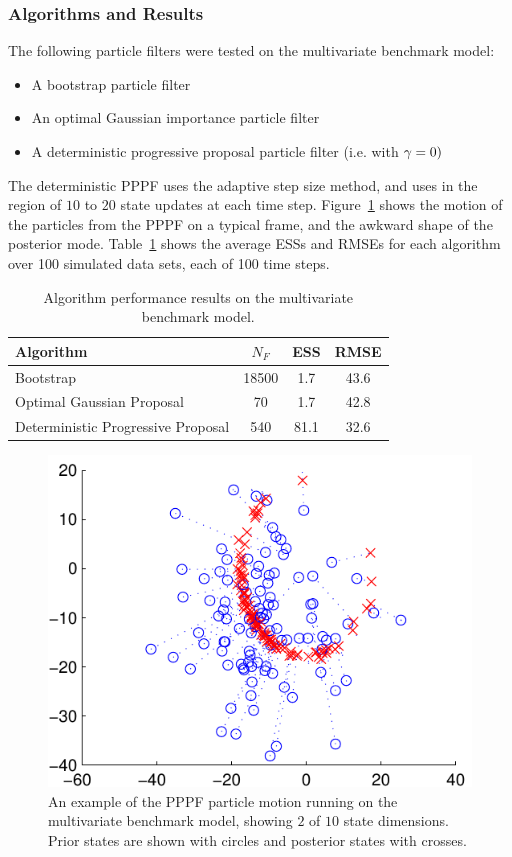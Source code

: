 \documentclass{article}
\begin{document}
\subsubsection{Algorithms and Results}

The following particle filters were tested on the multivariate benchmark model:
\begin{itemize}
  \item A bootstrap particle filter
  \item An optimal Gaussian importance particle filter
  \item A deterministic progressive proposal particle filter (i.e. with $\gamma=0)$
\end{itemize}

The deterministic PPPF uses the adaptive step size method, and uses in the region of $10$ to $20$ state updates at each time step. Figure~\ref{fig:nlng_example_frame} shows the motion of the particles from the PPPF on a typical frame, and the awkward shape of the posterior mode. Table~\ref{tab:nlng_results} shows the average ESSs and RMSEs for each algorithm over 100 simulated data sets, each of 100 time steps.
%
\begin{table}
\centering
\begin{tabular}{l||c|c|c}
Algorithm                                & $N_F$ & ESS  & RMSE \\
\hline
Bootstrap                                & 18500 &  1.7 & 43.6 \\
Optimal Gaussian Proposal                &    70 &  1.7 & 42.8 \\
Deterministic Progressive Proposal         &   540 & 81.1 & 32.6 \\
\end{tabular}
\caption{Algorithm performance results on the multivariate benchmark model.}
\label{tab:nlng_results}
\end{table}
%
\begin{figure}
\centering
\includegraphics[width=0.7\columnwidth]{nlng_example_frame_deter.pdf}
\caption{An example of the PPPF particle motion running on the multivariate benchmark model, showing $2$ of $10$ state dimensions. Prior states are shown with circles and posterior states with crosses.}
\label{fig:nlng_example_frame}
\end{figure}
\end{document}
